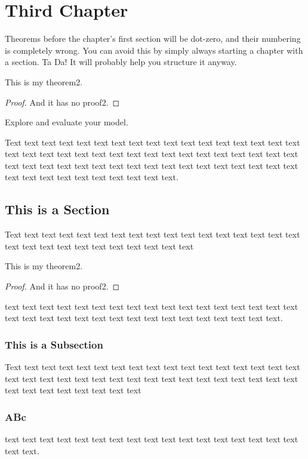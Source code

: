 \chapter{Third Chapter}

Theorems before the chapter's first section will be dot-zero, 
and their numbering is completely wrong. You can avoid this
by simply always starting a chapter with a section. Ta Da! 
It will probably help you structure it anyway. 

\begin{thm}[My Theorem2]
This is my theorem2.
\end{thm}
\begin{proof}
And it has no proof2.
\end{proof}

Explore and evaluate your model.

Text text text text text text text text text text text text text text
text text text text text text text text text text text text text text
text text text text text text text text text text text text text text
text text text text text text text text text text text text text text
text text text text text.

\section{This is a Section}
Text text text text text text text text text text text text text text
text text text text text text text text text text text text text text

\begin{thm}[My Theorem2]
This is my theorem2.
\end{thm}
\begin{proof}
And it has no proof2.
\end{proof}

text text text text text text text text text text text text text text
text text text text text text text text text text text text text text
text text text text text. 

\subsection{This is a Subsection}
Text text text text text text text text text text text text text text
text text text text text text text text text text text text text text
text text text text text text text text text text text text text text

\subsection{ABc}
text text text text text text text text text text text text text text
text text text text text. 

